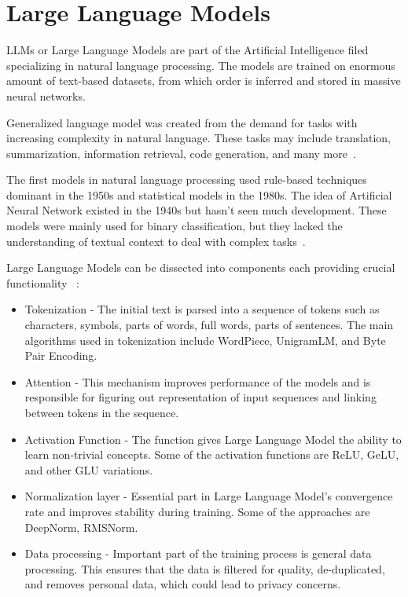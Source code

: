 \section{Large Language Models}\label{sec:large-language-models}
LLMs or Large Language Models are part of the Artificial Intelligence filed specializing in natural language processing.
The models are trained on enormous amount of text-based datasets, from which order is inferred and stored in massive
neural networks.

Generalized language model was created from the demand for tasks with increasing complexity in natural language.
These tasks may include translation, summarization, information retrieval, code generation, and many more~\parencite[2]{naveed2025llm}.

The first models in natural language processing used rule-based techniques dominant in the 1950s and statistical models
in the 1980s.
The idea of Artificial Neural Network existed in the 1940s but hasn't seen much development.
These models were mainly used for binary classification, but they lacked the understanding of textual context
to deal with complex tasks~\parencite[History of Large Language Models]{raiaan2024llm}.

Large Language Models can be dissected into components each providing crucial functionality
~\parencite[Background of Large Language Models]{raiaan2024llm}:

\begin{itemize}
    \item Tokenization - The initial text is parsed into a sequence of tokens such as characters, symbols, parts of words, full words, parts of sentences.
        The main algorithms used in tokenization include WordPiece, UnigramLM, and Byte Pair Encoding.
    \item Attention - This mechanism improves performance of the models and is responsible for figuring out representation
        of input sequences and linking between tokens in the sequence.
    \item Activation Function - The function gives Large Language Model the ability to learn non-trivial concepts.
        Some of the activation functions are ReLU, GeLU, and other GLU variations.
    \item Normalization layer - Essential part in Large Language Model's convergence rate and improves stability during training.
        Some of the approaches are DeepNorm, RMSNorm.
    \item Data processing - Important part of the training process is general data processing.
        This ensures that the data is filtered for quality, de-duplicated, and removes personal data,
        which could lead to privacy concerns.
\end{itemize}

